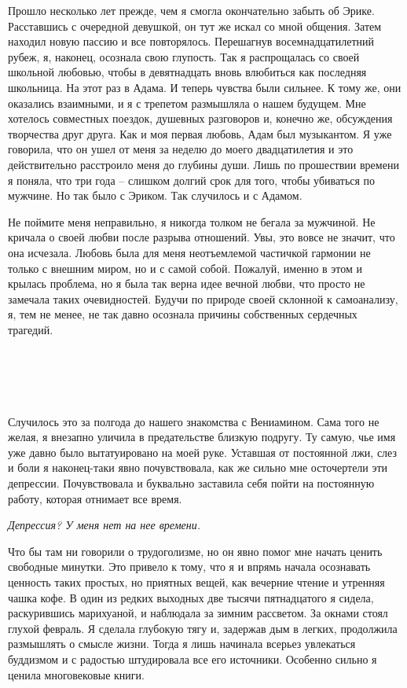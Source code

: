 \documentclass[
]{book}
\begin{document}
Прошло несколько лет прежде, чем я смогла окончательно забыть об Эрике. Расставшись с очередной девушкой, он тут же искал со мной общения. Затем находил новую пассию и все повторялось. Перешагнув восемнадцатилетний рубеж, я, наконец, осознала свою глупость. Так я распрощалась со своей школьной любовью, чтобы в девятнадцать вновь влюбиться как последняя школьница. На этот раз в Адама. И теперь чувства были сильнее. К тому же, они оказались взаимными, и я с трепетом размышляла о нашем будущем. Мне хотелось совместных поездок, душевных разговоров и, конечно же, обсуждения творчества друг друга. Как и моя первая любовь, Адам был музыкантом. Я уже говорила, что он ушел от меня за неделю до моего двадцатилетия и это действительно расстроило меня до глубины души. Лишь по прошествии времени я поняла, что три года -- слишком долгий срок для того, чтобы убиваться по мужчине. Но так было с Эриком. Так случилось и с Адамом.

Не поймите меня неправильно, я никогда толком не бегала за мужчиной. Не кричала о своей любви после разрыва отношений. Увы, это вовсе не значит, что она исчезала. Любовь была для меня неотъемлемой частичкой гармонии не только с внешним миром, но и с самой собой. Пожалуй, именно в этом и крылась проблема, но я была так верна идее вечной любви, что просто не замечала таких очевидностей. Будучи по природе своей склонной к самоанализу, я, тем не менее, не так давно осознала причины собственных сердечных трагедий.

\hypertarget{chapter-22}{%
\chapter{~}\label{chapter-22}}

Случилось это за полгода до нашего знакомства с Вениамином. Сама того не желая, я внезапно уличила в предательстве близкую подругу. Ту самую, чье имя уже давно было вытатуировано на моей руке. Уставшая от постоянной лжи, слез и боли я наконец-таки явно почувствовала, как же сильно мне осточертели эти депрессии. Почувствовала и буквально заставила себя пойти на постоянную работу, которая отнимает все время.

\emph{Депрессия? У меня нет на нее времени.}

Что бы там ни говорили о трудоголизме, но он явно помог мне начать ценить свободные минутки. Это привело к тому, что я и впрямь начала осознавать ценность таких простых, но приятных вещей, как вечерние чтение и утренняя чашка кофе. В один из редких выходных две тысячи пятнадцатого я сидела, раскурившись марихуаной, и наблюдала за зимним рассветом. За окнами стоял глухой февраль. Я сделала глубокую тягу и, задержав дым в легких, продолжила размышлять о смысле жизни. Тогда я лишь начинала всерьез увлекаться буддизмом и с радостью штудировала все его источники. Особенно сильно я ценила многовековые книги.
\end{document}
